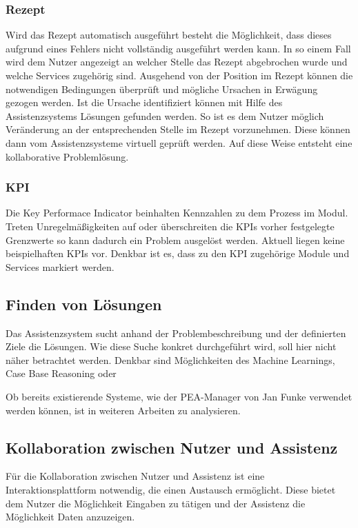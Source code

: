 \subsubsection*{Rezept}
Wird das Rezept automatisch ausgeführt besteht die Möglichkeit, dass dieses aufgrund eines Fehlers nicht vollständig ausgeführt werden kann. In so einem Fall wird dem Nutzer angezeigt an welcher Stelle das Rezept abgebrochen wurde und welche Services zugehörig sind. Ausgehend von der Position im Rezept können die notwendigen Bedingungen überprüft und mögliche Ursachen in Erwägung gezogen werden. Ist die Ursache identifiziert können mit Hilfe des Assistenzsystems Lösungen gefunden werden. So ist es dem Nutzer möglich Veränderung an der entsprechenden Stelle im Rezept vorzunehmen. Diese können dann vom Assistenzsysteme virtuell geprüft werden. Auf diese Weise entsteht eine kollaborative Problemlösung.  

\subsubsection*{KPI}
Die Key Performace Indicator beinhalten Kennzahlen zu dem Prozess im Modul. Treten Unregelmäßigkeiten auf oder überschreiten die KPIs vorher festgelegte Grenzwerte so kann dadurch ein Problem ausgelöst werden. Aktuell liegen keine beispielhaften KPIs vor. Denkbar ist es, dass zu den KPI zugehörige Module und Services markiert werden.

\subsection{Finden von Lösungen}
Das Assistenzsystem sucht anhand der Problembeschreibung und der definierten Ziele die Lösungen. Wie diese Suche konkret durchgeführt wird, soll hier nicht näher betrachtet werden. Denkbar sind Möglichkeiten des Machine Learnings, Case Base Reasoning oder  

Ob bereits existierende Systeme, wie der PEA-Manager von Jan Funke \cite{Funke2018} verwendet werden können, ist in weiteren Arbeiten zu analysieren. 

\subsection{Kollaboration zwischen Nutzer und Assistenz}
\label{4:Kollaboration}
Für die Kollaboration zwischen Nutzer und Assistenz ist eine Interaktionsplattform notwendig, die einen Austausch ermöglicht. Diese bietet dem Nutzer die Möglichkeit Eingaben zu tätigen und der Assistenz die Möglichkeit Daten anzuzeigen.


